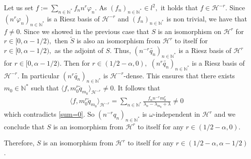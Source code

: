 \documentclass[11pt, dvipsnames]{amsart}
\begin{document}
\begin{itemize}
Let us set $f:=\sum_{n\in \mathbb{N}^*}f_n n^{r}\varphi_n.$ As $(f_n)_{n\in \mathbb{N}^*}\in l^2,$ it holds that $f\in \mathcal{H}^{-r}.$ Since $(n^r\varphi_n)_{n\in \mathbb{N}^*}$ is a Riesz basis of $\mathcal{H}^{-r}$ and $(f_n)_{n\in \mathbb{N}^*}$ is non trivial, we have that $f\neq 0$. Since we showed in the previous case that $S$ is an isomorphism on $\mathcal{H}^r$ for $r\in [0,\alpha-1/2),$ then $\tilde S$ is also an isomorphism from $\mathcal{H}^r$ to itself for $r\in [0,\alpha-1/2),$ as the adjoint of $S.$ 
Thus, $(n^{-r}\widetilde{q_n})_{n\in \mathbb{N}^*}$ is a Riesz basis of $\mathcal{H}^r$ for $r\in [0,\alpha-1/2).$ Then for $r\in (1/2-\alpha,0),$  $(n^{r}\widetilde{q_n})_{n\in \mathbb{N}^*}$ is a Riesz basis of $\mathcal{H}^{-r}.$ In particular $( n^{r}\widetilde{q_n})_{n\in \mathbb{N}^*}$ is $\mathcal{H}^{-r}$-dense. This ensures that there exists $m_0\in \mathbb{N}^*$ such that $\langle f,m_0^r\tilde q_{m_0}\rangle_{\mathcal{H}^{-r}}\neq 0.$ It follows that
\begin{align*}
    \langle f,m_0^r\tilde q_{m_0}\rangle_{\mathcal{H}^{-r}}=\sum_{n\in \mathbb{N}^*}\frac{f_n n^{-r}m_0^r}{\lambda_n-\lambda_{m_0}+\lambda}\neq 0
\end{align*} which contradicts \eqref{sum=0}. So $(n^{-r}q_n)_{n\in\mathbb{N}^*}$ is $\omega$-independent in $\mathcal{H}^r$ and we conclude that $S$ is an isomorphism from $\mathcal{H}^r$ to itself for any $r\in(1/2-\alpha,0).$
\end{itemize}
Therefore, $S$ is an isomorphism from $\mathcal{H}^r$ to itself for any $r\in(1/2-\alpha,\alpha-1/2)$.
\end{document}
